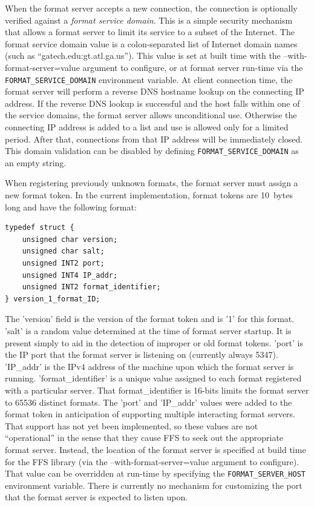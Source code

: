 \documentclass{article}
\begin{document}
When the format server accepts a new connection, the connection is
optionally verified against a {\it format service domain}.  This is a simple
security mechanism that allows a format server to limit its service to a
subset of the Internet.  The format service domain value is a
colon-separated list of Internet domain names (such as
``gatech.edu:gt.atl.ga.us'').  This value is set at built time with the
--with-format-server=value argument to configure, or at format server
run-time via the {\tt FORMAT\_SERVICE\_DOMAIN} environment variable.  At
client connection time, the format server will perform a reverse DNS
hostname lookup on the connecting IP address.  If the reverse DNS lookup is
successful and the host falls within one of the service domains, the format
server allows unconditional use.  Otherwise the connecting IP address is
added to a list and use is allowed only for a limited period.  After that,
connections from that IP address will be immediately closed.  This domain
validation can be disabled by defining {\tt FORMAT\_SERVICE\_DOMAIN} as an
empty string.

When registering previously unknown formats, the format server must assign a
new format token.  In the current implementation, format tokens are 10~bytes
long and have the following format:
\begin{verbatim}
typedef struct {
    unsigned char version;
    unsigned char salt;
    unsigned INT2 port;
    unsigned INT4 IP_addr;
    unsigned INT2 format_identifier;
} version_1_format_ID;
\end{verbatim}
The 'version' field is the version of the format token and is '1' for this
format.  'salt' is a random value determined at the time of format server
startup.  It is present simply to aid in the detection of improper or old
format tokens.  'port' is the IP port that the format server is listening on
(currently always 5347).  'IP\_addr' is the IPv4 address of the machine upon
which the format server is running.  'format\_identifier' is a unique value
assigned to each format registered with a particular server.  That
format\_identifier is 16-bits limits the format server to 65536 distinct
formats.  The 'port' and 'IP\_addr' values were added to the format token in
anticipation of supporting multiple interacting format servers.  That
support has not yet been implemented, so these values are not
``operational'' in the sense that they cause FFS to seek out the
appropriate format server.  Instead, the location of the format server is
specified at build time for the FFS library (via the
--with-format-server=value argument to configure).  That value can be
overridden at run-time by specifying the {\tt FORMAT\_SERVER\_HOST}
environment variable.   There is currently no mechanism for customizing the
port that the format server is expected to listen upon.
\end{document}
